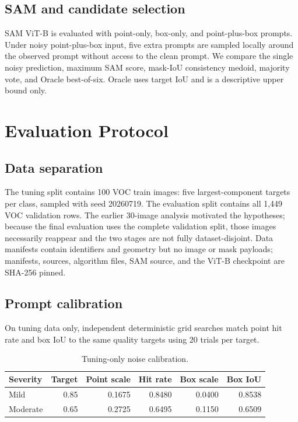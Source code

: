 \subsection{SAM and candidate selection}
SAM ViT-B is evaluated with point-only, box-only, and point-plus-box prompts. Under noisy point-plus-box input, five extra prompts are sampled locally around the observed prompt without access to the clean prompt. We compare the single noisy prediction, maximum SAM score, mask-IoU consistency medoid, majority vote, and Oracle best-of-six. Oracle uses target IoU and is a descriptive upper bound only.

\section{Evaluation Protocol}

\subsection{Data separation}
The tuning split contains 100 VOC train images: five largest-component targets per class, sampled with seed 20260719. The evaluation split contains all 1,449 VOC validation rows. The earlier 30-image analysis motivated the hypotheses; because the final evaluation uses the complete validation split, those images necessarily reappear and the two stages are not fully dataset-disjoint. Data manifests contain identifiers and geometry but no image or mask payloads; manifests, sources, algorithm files, SAM source, and the ViT-B checkpoint are SHA-256 pinned.

\subsection{Prompt calibration}
On tuning data only, independent deterministic grid searches match point hit rate and box IoU to the same quality targets using 20 trials per target.

\begin{table}[ht]
\centering
\caption{Tuning-only noise calibration.}
\begin{tabular}{lrrrrr}
\toprule
Severity & Target & Point scale & Hit rate & Box scale & Box IoU \\
\midrule
Mild & 0.85 & 0.1675 & 0.8480 & 0.0400 & 0.8538 \\
Moderate & 0.65 & 0.2725 & 0.6495 & 0.1150 & 0.6509 \\
\bottomrule
\end{tabular}
\end{table}

